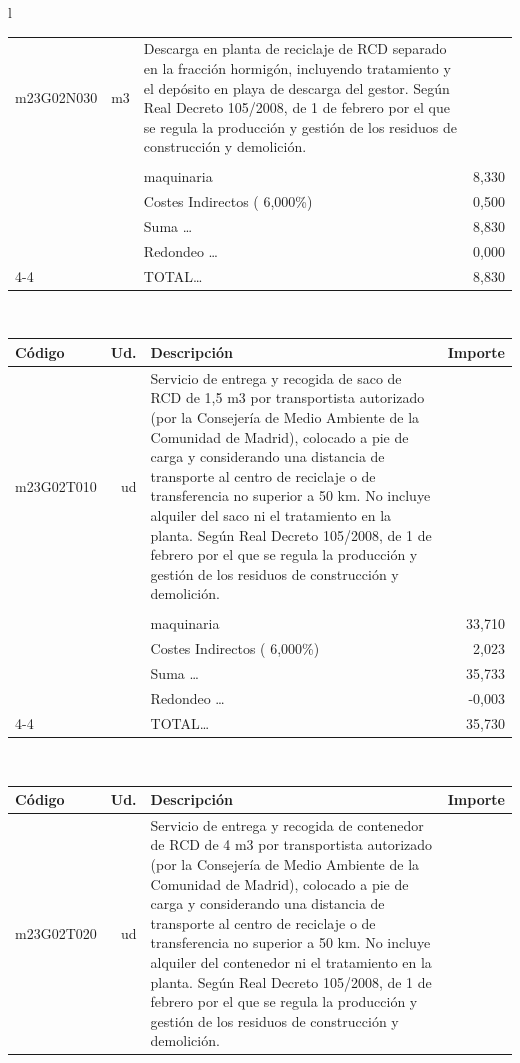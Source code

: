 \documentclass{book}%
\begin{document}
\begin{longtable}{l}
\begin{tabular}{l r p{60mm} r}
\hline%
m23G02N030&m3&Descarga en planta de reciclaje de RCD separado en la fracción hormigón, incluyendo tratamiento y el depósito en playa de descarga del gestor. Según Real Decreto 105/2008, de 1 de febrero por el que se regula la producción y gestión de los residuos de construcción y demolición.&\\%
&&&\\%
&&maquinaria&     8,330\\%
&&Costes Indirectos (     6,000\%)&     0,500\\%
&&Suma \ldots&     8,830\\%
&&Redondeo \ldots&     0,000\\%
\cline{4-4}%
&&TOTAL\ldots&     8,830\\%
\end{tabular}\\%
\begin{tabular}{l r p{60mm} r}%
Código&Ud.&Descripción&Importe\\%
\hline%
m23G02T010&ud&Servicio de entrega y recogida de saco de RCD de 1,5 m3 por transportista autorizado (por la Consejería de Medio Ambiente de la Comunidad de Madrid), colocado a pie de carga y considerando una distancia de transporte al centro de reciclaje o de transferencia no superior a 50 km. No incluye alquiler del saco ni el tratamiento en la planta. Según Real Decreto 105/2008, de 1 de febrero por el que se regula la producción y gestión de los residuos de construcción y demolición.&\\%
&&&\\%
&&maquinaria&    33,710\\%
&&Costes Indirectos (     6,000\%)&     2,023\\%
&&Suma \ldots&    35,733\\%
&&Redondeo \ldots&    {-}0,003\\%
\cline{4-4}%
&&TOTAL\ldots&    35,730\\%
\end{tabular}\\%
\begin{tabular}{l r p{60mm} r}%
Código&Ud.&Descripción&Importe\\%
\hline%
m23G02T020&ud&Servicio de entrega y recogida de contenedor de RCD de 4 m3 por transportista autorizado (por la Consejería de Medio Ambiente de la Comunidad de Madrid), colocado a pie de carga y considerando una distancia de transporte al centro de reciclaje o de transferencia no superior a 50 km. No incluye alquiler del contenedor ni el tratamiento en la planta. Según Real Decreto 105/2008, de 1 de febrero por el que se regula la producción y gestión de los residuos de construcción y demolición.&\\%

\end{tabular}
\end{longtable}
\end{document}
